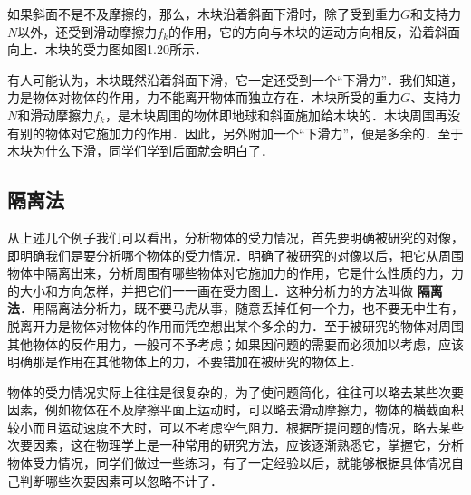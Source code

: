 如果斜面不是不及摩擦的，那么，木块沿着斜面下滑时，除了受到重力$G$和支持力$N$以外，还受到滑动摩擦力$f_k$的作用，它的方向与木块的运动方向相反，沿着斜面向上．木块的受力图如图1.20所示．

有人可能认为，木块既然沿着斜面下滑，它一定还受到一个“下滑力”．我们知道，力是物体对物体的作用，力不能离开物体而独立存在．木块所受的重力$G$、支持力$N$和滑动摩擦力$f_k$，是木块周围的物体即地球和斜面施加给木块的．木块周围再没有别的物体对它施加力的作用．因此，另外附加一个“下滑力”，便是多余的．至于木块为什么下滑，同学们学到后面就会明白了．


\subsection{隔离法}
从上述几个例子我们可以看出，分析物体的受力情况，首先要明确被研究的对像，即明确我们是要分析哪个物体的受力情况．明确了被研究的对像以后，把它从周围物体中隔离出来，分析周围有哪些物体对它施加力的作用，它是什么性质的力，力的大小和方向怎样，并把它们一一画在受力图上．这种分析力的方法叫做\textbf{ 隔离法}．用隔离法分析力，既不要马虎从事，随意丢掉任何一个力，也不要无中生有，脱离开力是物体对物体的作用而凭空想出某个多余的力．至于被研究的物体对周围其他物体的反作用力，一般可不予考虑；如果因问题的需要而必须加以考虑，应该明确那是作用在其他物体上的力，不要错加在被研究的物体上．

物体的受力情况实际上往往是很复杂的，为了使问题简化，往往可以略去某些次要因素，例如物体在不及摩擦平面上运动时，可以略去滑动摩擦力，物体的横截面积较小而且运动速度不大时，可以不考虑空气阻力．根据所提问题的情况，略去某些次要因素，这在物理学上是一种常用的研究方法，应该逐渐熟悉它，掌握它，分析物体受力情况，同学们做过一些练习，有了一定经验以后，就能够根据具体情况自己判断哪些次要因素可以忽略不计了．

